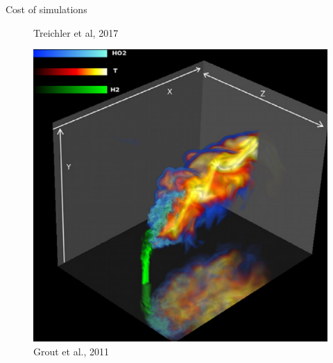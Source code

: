 \documentclass[]{beamer}
\begin{document}
\begin{frame}{Cost of simulations}
\begin{minipage}{0.3\linewidth}
\begin{figure}
			\caption*{\tiny{Treichler et al, 2017}}
		\end{figure}
	\end{minipage}
	\hspace{1cm}
	\centering
	\begin{minipage}{0.3\linewidth}
		\centering
		\begin{figure}
			\centering
			\includegraphics[width=0.91\linewidth]{intro/jetCrossflowDNS.png}
			\caption*{\tiny{Grout et al., 2011}}
		\end{figure}
	\end{minipage}
\end{frame}
\end{document}
